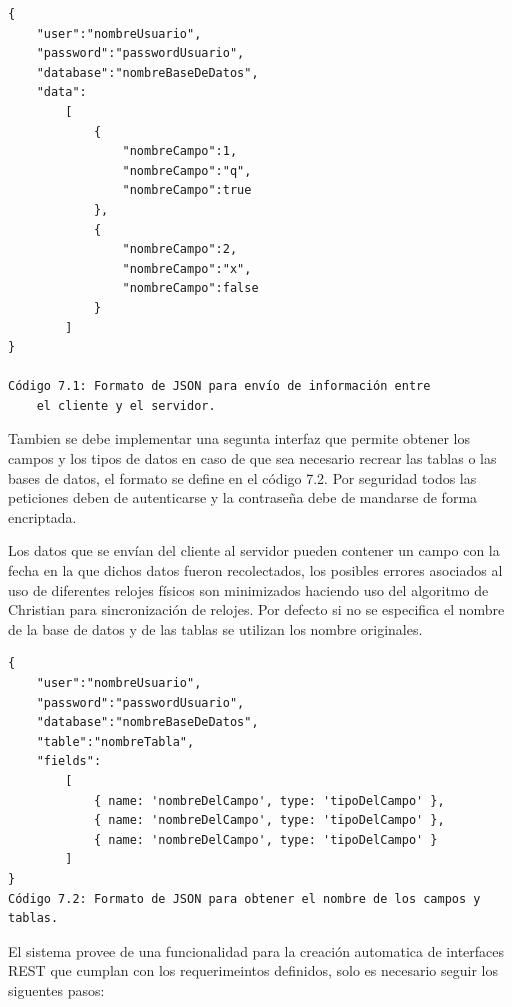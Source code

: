 \documentclass[12pt,a4paper,spanish,openany]{book}
\begin{document}
 
\begin{verbatim}
{
    "user":"nombreUsuario",
    "password":"passwordUsuario",
    "database":"nombreBaseDeDatos",
    "data":
        [
            {
                "nombreCampo":1,
                "nombreCampo":"q",
                "nombreCampo":true
            },
            {
                "nombreCampo":2,
                "nombreCampo":"x",
                "nombreCampo":false
            }
        ]
}

Código 7.1: Formato de JSON para envío de información entre
    el cliente y el servidor. 
\end{verbatim}




Tambien se debe implementar una segunta interfaz que permite obtener los
campos y los tipos de datos en caso de que sea necesario recrear las tablas o
las bases de datos, el formato se define en el código 7.2. 
Por seguridad todos las peticiones deben de autenticarse y la contraseña debe de
mandarse de forma encriptada.

Los datos que se envían del cliente al servidor pueden contener un campo con la
fecha en la que dichos datos fueron recolectados, los posibles errores asociados
al uso de diferentes relojes físicos son minimizados haciendo uso del
algoritmo de Christian para sincronización de relojes.
Por defecto si no se especifica el nombre de la base de datos y de las tablas se
utilizan los nombre originales.
\newpage

\begin{verbatim}
{
    "user":"nombreUsuario",
    "password":"passwordUsuario",
    "database":"nombreBaseDeDatos",
    "table":"nombreTabla",
    "fields": 
        [ 
            { name: 'nombreDelCampo', type: 'tipoDelCampo' }, 
            { name: 'nombreDelCampo', type: 'tipoDelCampo' }, 
            { name: 'nombreDelCampo', type: 'tipoDelCampo' } 
        ]
}
Código 7.2: Formato de JSON para obtener el nombre de los campos y tablas.
\end{verbatim}



El sistema provee de una funcionalidad para la creación automatica de interfaces
REST que cumplan con los requerimeintos definidos, solo es necesario seguir los
siguentes pasos:
\end{document}
